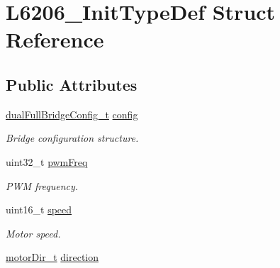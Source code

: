\hypertarget{struct_l6206___init_type_def}{}\section{L6206\+\_\+\+Init\+Type\+Def Struct Reference}
\label{struct_l6206___init_type_def}
\subsection*{Public Attributes}
\begin{DoxyCompactItemize}
\item 
\mbox{\label{struct_l6206___init_type_def_a6755a71f006fc4b516210784128c2dff}} 
\mbox{\hyperlink{group___dual___full___bridge___configuration_gab5810188b32c0f4c04abcbf058f09722}{dual\+Full\+Bridge\+Config\+\_\+t}} \mbox{\hyperlink{struct_l6206___init_type_def_a6755a71f006fc4b516210784128c2dff}{config}}
\begin{DoxyCompactList}\small\item\em Bridge configuration structure. \end{DoxyCompactList}\item 
\mbox{\label{struct_l6206___init_type_def_a7ea20fc2395b2e6d790f0e40d0c47fc1}} 
uint32\+\_\+t \mbox{\hyperlink{struct_l6206___init_type_def_a7ea20fc2395b2e6d790f0e40d0c47fc1}{pwm\+Freq}}
\begin{DoxyCompactList}\small\item\em P\+WM frequency. \end{DoxyCompactList}\item 
\mbox{\label{struct_l6206___init_type_def_a0bd6942d638b0b16ed9f1ae8871662e5}} 
uint16\+\_\+t \mbox{\hyperlink{struct_l6206___init_type_def_a0bd6942d638b0b16ed9f1ae8871662e5}{speed}}
\begin{DoxyCompactList}\small\item\em Motor speed. \end{DoxyCompactList}\item 
\mbox{\label{struct_l6206___init_type_def_a20047dd327627c662bb3d4301a1f2c4d}} 
\mbox{\hyperlink{group___device___direction___options_ga4eaf4196e4d11d552f58f3fab218a8c7}{motor\+Dir\+\_\+t}} \mbox{\hyperlink{struct_l6206___init_type_def_a20047dd327627c662bb3d4301a1f2c4d}{direction}}

\end{DoxyCompactItemize}
